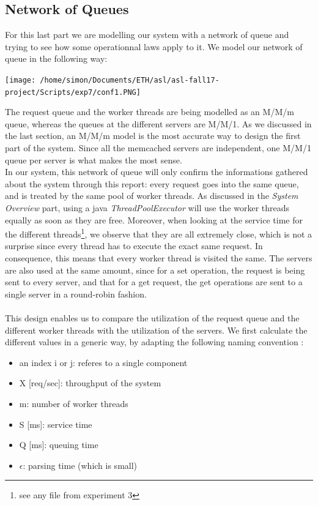 \documentclass[11pt,a4paper]{article}
\begin{document}
\subsection{Network of Queues}
For this last part we are modelling our system with a network of queue and trying to see how some operationnal laws apply to it. We model our network of queue in the following way:
\begin{center} 
\texttt{[image: /home/simon/Documents/ETH/asl/asl-fall17-project/Scripts/exp7/conf1.PNG]}
\end{center} 
The request queue and the worker threads are being modelled as an M/M/m queue, whereas the queues at the different servers are M/M/1. As we discussed in the last section, an M/M/m model is the most accurate way to design the first part of the system. Since all the memcached servers are independent, one M/M/1 queue per server is what makes the most sense. 
\\
In our system, this network of queue will only confirm the informations gathered about the system through this report: every request goes into the same queue, and is treated by the same pool of worker threads. As discussed in the \textit{System Overview} part, using a java \textit{ThreadPoolExecutor} will use the worker threads equally as soon as they are free. Moreover, when looking at the service time for the different threads\footnote{see any file from experiment 3}, we observe that they are all extremely close, which is not a surprise since every thread has to execute the exact same request. In consequence, this means that every worker thread is visited the same. 
The servers are also used at the same amount, since for a set operation, the request is being sent to every server, and that for a get request, the get operations are sent to a single server in a round-robin fashion.    
\\\\
This design enables us to compare the utilization of the request queue and the different worker threads with the utilization of the servers. We first calculate the different values in a generic way, by adapting the following naming convention :
\begin{itemize}
\item an index i or j: referes to a single component
\item X [req/sec]: throughput of the system
\item m: number of worker threads
\item S [ms]: service time
\item Q [ms]: queuing time
\item \(\epsilon \): parsing time (which is small)
\end{itemize}  
\end{document}
